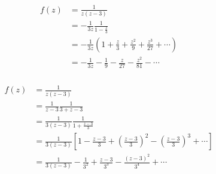 \documentclass{article}
\begin{document}
\begin{align*}
  f(z) & = \frac{1}{z (z - 3)}                                                                     \\
       & = -\frac{1}{3 z} \frac{1}{1 - \frac{z}{3}}                                                \\
       & = -\frac{1}{3 z} \left( 1 + \frac{z}{3} + \frac{z^2}{9} + \frac{z^3}{27} + \cdots \right) \\
       & = -\frac{1}{3 z} - \frac{1}{9} - \frac{z}{27} - \frac{z^2}{81} - \cdots
\end{align*}

\setcounter{subsubsection}{8}
\subsubsection{}

\begin{align*}
  f(z) & = \frac{1}{z (z - 3)}                                                                                                                   \\
       & = \frac{1}{z - 3} \frac{1}{3 + z - 3}                                                                                                   \\
       & = \frac{1}{3 (z - 3)} \frac{1}{1 + \frac{z - 3}{3}}                                                                                     \\
       & = \frac{1}{3 (z - 3)} \left[ 1 - \frac{z - 3}{3} + \left( \frac{z - 3}{3} \right)^2 - \left( \frac{z - 3}{3} \right)^3 + \cdots \right] \\
       & = \frac{1}{3 (z - 3)} - \frac{1}{3^2} + \frac{z - 3}{3^3} - \frac{(z - 3)^2}{3^4} + \cdots
\end{align*}

\setcounter{subsubsection}{10}
\subsubsection{}
\end{document}
